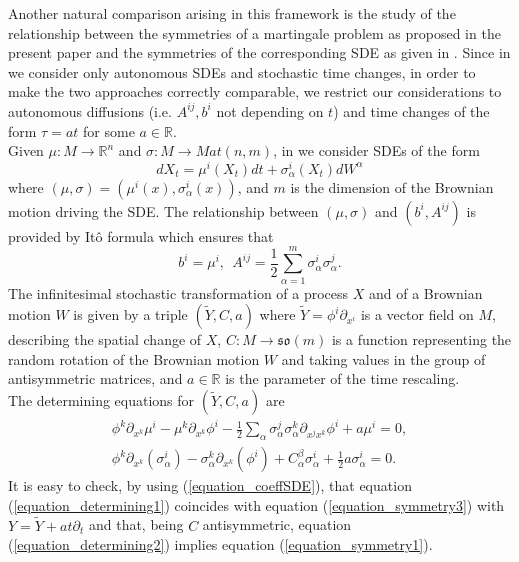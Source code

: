 \documentclass{article}[10pt]
\newcommand{\refeqn}[1]{(\ref{#1})}
\begin{document}
Another  natural comparison arising in this framework is the study of the relationship  between  the symmetries of a martingale problem as proposed in the present paper and  the symmetries of the corresponding  SDE as given in \cite{DMU1}. Since in \cite{DMU1} we consider only autonomous SDEs and stochastic  time changes, in order to make the two approaches correctly comparable, we restrict our considerations to autonomous diffusions (i.e. $A^{ij},b^i$  not depending on $t$) and  time changes of the form  $\tau=a t$ for some $a \in \mathbb{R}$.\\
Given  $\mu:M \rightarrow \mathbb{R}^n$ and $\sigma:M \rightarrow Mat(n,m)$,  in \cite{DMU1} we consider  SDEs of the form
$$dX_t=\mu^i(X_t) dt +\sigma^i_{\alpha}(X_t) dW^{\alpha}$$
where  $(\mu,\sigma)=(\mu^i(x),\sigma^i_{\alpha}(x))$,  and  $m$ is the dimension of the Brownian motion driving the SDE. The relationship between $(\mu,\sigma)$ and $(b^i,A^{ij})$ is provided  by It\^o formula which  ensures that
\begin{equation}\label{equation_coeffSDE}
b^i=\mu^i,  \ \ A^{ij}=\frac{1}{2}\sum_{\alpha=1}^m \sigma^i_{\alpha}\sigma^j_{\alpha}.
\end{equation}
The infinitesimal stochastic transformation of a  process $X$  and of a Brownian motion $W$ is given by a triple $(\tilde{Y},C,a)$
where $\tilde{Y}=\phi^i\partial_{x^i}$ is a vector field on $M$,  describing the spatial change of $X$, $C:M \rightarrow \mathfrak{so}(m)$ is
a function representing  the random rotation of the Brownian motion $W$ and taking values in the group of antisymmetric matrices,  and $a \in \mathbb{R}$ is the parameter of the time rescaling.\\
The determining equations for $(\tilde{Y},C,a)$ are
\begin{eqnarray}
&\phi^k\partial_{x^k}\mu^i-\mu^k\partial_{x^k}\phi^i-\frac{1}{2}\sum_{\alpha}\sigma_{\alpha}^{j}\sigma_{\alpha}^k\partial_{x^jx^k}\phi^i+a \mu^i=0,&\label{equation_determining1}\\
&\phi^k\partial_{x^k}(\sigma^i_{\alpha})-\sigma_{\alpha}^k\partial_{x^k}(\phi^i)+C^{\beta}_{\alpha}\sigma^i_{\alpha}+\frac{1}{2}a \sigma^i_{\alpha}=0. &
\label{equation_determining2}
\end{eqnarray}
It is easy to check, by using \refeqn{equation_coeffSDE},  that equation \refeqn{equation_determining1} coincides with equation \refeqn{equation_symmetry3}
with $Y=\tilde{Y}+at\partial_t$ and that, being $C$ antisymmetric,  equation \refeqn{equation_determining2} implies equation \refeqn{equation_symmetry1}.
\end{document}
